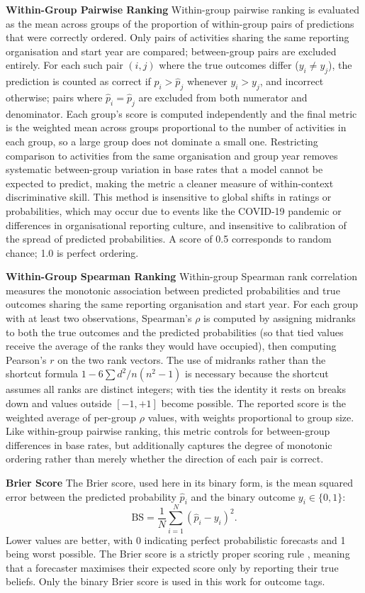 \textbf{Within-Group Pairwise Ranking}
Within-group pairwise ranking is evaluated as the mean across groups of the proportion of within-group pairs of predictions that were correctly ordered. Only pairs of activities sharing the same reporting organisation and start year are compared; between-group pairs are excluded entirely. For each such pair $(i, j)$ where the true outcomes differ ($y_i \neq y_j$), the prediction is counted as correct if $\hat{p}_i > \hat{p}_j$ whenever $y_i > y_j$, and incorrect otherwise; pairs where $\hat{p}_i = \hat{p}_j$ are excluded from both numerator and denominator. Each group's score is computed independently and the final metric is the weighted mean across groups proportional to the number of activities in each group, so a large group does not dominate a small one. Restricting comparison to activities from the same organisation and group year removes systematic between-group variation in base rates that a model cannot be expected to predict, making the metric a cleaner measure of within-context discriminative skill. This method is insensitive to global shifts in ratings or probabilities, which may occur due to events like the COVID-19 pandemic or differences in organisational reporting culture, and insensitive to calibration of the spread of predicted probabilities. A score of 0.5 corresponds to random chance; 1.0 is perfect ordering.

\textbf{Within-Group Spearman Ranking}
Within-group Spearman rank correlation measures the monotonic association between predicted probabilities and true outcomes sharing the same reporting organisation and start year. For each group with at least two observations, Spearman's $\rho$ is computed by assigning midranks to both the true outcomes and the predicted probabilities (so that tied values receive the average of the ranks they would have occupied), then computing Pearson's $r$ on the two rank vectors. The use of midranks rather than the shortcut formula $1 - 6\sum d^2 / n(n^2-1)$ is necessary because the shortcut assumes all ranks are distinct integers; with ties the identity it rests on breaks down and values outside $[-1, +1]$ become possible. The reported score is the weighted average of per-group $\rho$ values, with weights proportional to group size. Like within-group pairwise ranking, this metric controls for between-group differences in base rates, but additionally captures the degree of monotonic ordering rather than merely whether the direction of each pair is correct.

\textbf{Brier Score}
The Brier score, used here in its binary form, is the mean squared error between the predicted probability $\hat{p}_i$ and the binary outcome $y_i \in \{0,1\}$:
\[
  \mathrm{BS} = \frac{1}{N}\sum_{i=1}^{N}(\hat{p}_i - y_i)^2.
\]
Lower values are better, with 0 indicating perfect probabilistic forecasts and 1 being worst possible. The Brier score is a strictly proper scoring rule \citep{gneitingStrictlyProperScoring2007}, meaning that a forecaster maximises their expected score only by reporting their true beliefs. Only the binary Brier score is used in this work for outcome tags.

